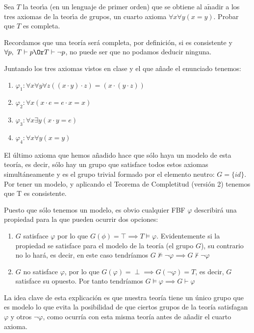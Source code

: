 \begin{problem} 
Sea $T$ la teor\'{\i}a (en un lenguaje de primer orden) 
que se obtiene al a$\operatorname{\tilde{n}}$adir a los tres axiomas de la teor\'{\i}a de  grupos,
un cuarto axioma $\forall x\forall y (x = y)$. Probar que $T$ es completa.
\solution


Recordamos que una teoría será completa, por definición, si es consistente y $\forall p, \ T \vdash p \Or T\vdash \neg p$, no puede ser que no podamos deducir ninguna.

Juntando los tres axiomas vistos en clase y el que añade el enunciado tenemos:
\begin{enumerate}
\item $\varphi_1: \forall x\forall y\forall z ((x\cdot y)\cdot z) = (x\cdot(y\cdot z))$
\item $\varphi_2: \forall x(x\cdot e = e\cdot x = x)$
\item $\varphi_3: \forall x\exists y (x\cdot y = e)$
\item $\varphi_4: \forall x\forall y (x=y)$
\end{enumerate}

El último axioma que hemos añadido hace que sólo haya un modelo de esta teoría, es decir, sólo hay un grupo que satisface todos estos axiomas simultáneamente y es el grupo trivial formado por el elemento neutro: $G=\{id\}$. Por tener un modelo, y aplicando el Teorema de Completitud (versión 2) tenemos que T es consistente.

Puesto que sólo tenemos un modelo, es obvio cualquier FBF $\varphi$ describirá una propiedad para la que pueden ocurrir dos opciones:
\begin{enumerate}
\item $G$ satisface $\varphi$ por lo que $G(\phi)=\top \implies  T \vDash \varphi $. Evidentemente si la propiedad se satisface para el modelo de la teoría (el grupo $G$), su contrario no lo hará, es decir, en este caso tendríamos $G \nvDash \neg \varphi \implies G \nvdash \neg \varphi$


\item $G$ no satisface $\varphi$, por lo que $G(\varphi) = \perp \implies G(\neg \varphi) = T$, es decir, $G$ satisface su opuesto. Por tanto tendríamos $G \vDash \varphi \implies G \vdash \varphi$
\end{enumerate}

La idea clave de esta explicación es que nuestra teoría tiene un único grupo que es modelo lo que evita la posibilidad de que ciertos grupos de la teoría satisfagan $\varphi$ y otros $\neg \varphi$, como ocurría con esta misma teoría antes de añadir el cuarto axioma.


\end{problem}


